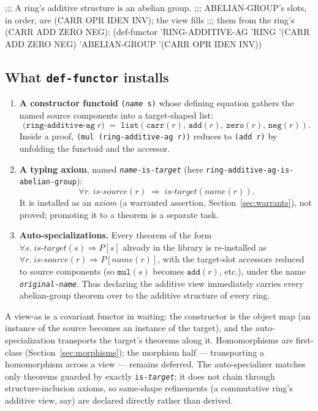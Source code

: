 \begin{VNBcode}
;;; A ring's additive structure is an abelian group.
;;; ABELIAN-GROUP's slots, in order, are (CARR OPR IDEN INV); the view fills
;;; them from the ring's (CARR ADD ZERO NEG):
(def-functor 'RING-ADDITIVE-AG
  'RING          '(CARR ADD ZERO NEG)
  'ABELIAN-GROUP '(CARR OPR IDEN INV))
\end{VNBcode}

\subsection{What \texttt{def-functor} installs}

\begin{enumerate}
\item \textbf{A constructor functoid} \texttt{(\textit{name} s)} whose defining
  equation gathers the named source components into a target-shaped list:
  \[
    \mathtt{(ring\text{-}additive\text{-}ag}\;r) \;=\;
      \mathtt{list}(\mathtt{carr}(r),\, \mathtt{add}(r),\,
                    \mathtt{zero}(r),\, \mathtt{neg}(r)).
  \]
  Inside a proof, \texttt{(mul (ring-additive-ag r))} reduces to
  \texttt{(add r)} by unfolding the functoid and the accessor.

\item \textbf{A typing axiom}, named
  \texttt{\textit{name}-is-\textit{target}} (here
  \texttt{ring-additive-ag-is-abelian-group}):
  \[
    \forall r.\; \mathit{is\text{-}source}(r) \;\Rightarrow\;
      \mathit{is\text{-}target}(\mathit{name}(r)).
  \]
  It is installed as an \emph{axiom}
  (a warranted assertion, Section~\ref{sec:warrants}), not proved;
  promoting it to a theorem is a separate task.

\item \textbf{Auto-specializations.}  Every theorem of the form
  $\forall s.\; \mathit{is\text{-}target}(s) \Rightarrow P[s]$ already in
  the library is re-installed as
  $\forall r.\; \mathit{is\text{-}source}(r) \Rightarrow P[\mathit{name}(r)]$,
  with the target-slot accessors reduced to source components (so
  $\mathtt{mul}(s)$ becomes $\mathtt{add}(r)$, etc.), under the name
  \texttt{\textit{original}-\textit{name}}.  Thus declaring the additive
  view immediately carries every abelian-group theorem over to the
  additive structure of every ring.
\end{enumerate}

\begin{remark}
A view-as is a covariant functor in waiting: the constructor is the
object map (an instance of the source becomes an instance of the
target), and the auto-specialization transports the target's theorems
along it.  Homomorphisms are first-class
(Section~\ref{sec:morphisms}); the morphism half --- transporting a
homomorphism across a view --- remains deferred.  The
auto-specializer matches only theorems guarded by exactly
\texttt{is-\textit{target}}; it does not chain through structure-inclusion axioms,
so same-shape refinements (a commutative ring's additive view, say) are
declared directly rather than derived.
\end{remark}

